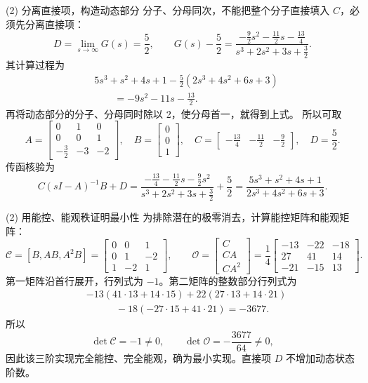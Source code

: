 \documentclass[11pt]{article}
\begin{document}
\begin{solution}
\begin{proofstep}{(2) 分离直接项，构造动态部分}
分子、分母同次，不能把整个分子直接填入 $C$，必须先分离直接项：
\[
D=\lim_{s\to\infty}G(s)=\frac52,
\qquad
G(s)-\frac52=\frac{-\frac92s^2-\frac{11}{2}s-\frac{13}{4}}
{s^3+2s^2+3s+\frac32}.
\]
其计算过程为
\[
\begin{aligned}
&5s^3+s^2+4s+1-\frac52(2s^3+4s^2+6s+3)\\
&\hspace{2em}=-9s^2-11s-\frac{13}{2}.
\end{aligned}
\]
再将动态部分的分子、分母同时除以 2，使分母首一，就得到上式。
所以可取
\[
\boxed{A=\begin{bmatrix}0&1&0\\0&0&1\\-\frac32&-3&-2\end{bmatrix},\quad
B=\begin{bmatrix}0\\0\\1\end{bmatrix},\quad
C=\begin{bmatrix}-\frac{13}{4}&-\frac{11}{2}&-\frac92\end{bmatrix},\quad D=\frac52.}
\]
传函核验为
\[
C(sI-A)^{-1}B+D
=\frac{-\frac{13}{4}-\frac{11}{2}s-\frac92s^2}{s^3+2s^2+3s+\frac32}+\frac52
=\frac{5s^3+s^2+4s+1}{2s^3+4s^2+6s+3}.
\]
\end{proofstep}

\pagebreak
\begin{proofstep}{(2) 用能控、能观秩证明最小性}
为排除潜在的极零消去，计算能控矩阵和能观矩阵：
\[
\mathcal C=[B,AB,A^2B]
=\begin{bmatrix}0&0&1\\0&1&-2\\1&-2&1\end{bmatrix},\qquad
\mathcal O=\begin{bmatrix}C\\CA\\CA^2\end{bmatrix}
=\frac14\begin{bmatrix}-13&-22&-18\\27&41&14\\-21&-15&13\end{bmatrix}.
\]
第一矩阵沿首行展开，行列式为 $-1$。第二矩阵的整数部分行列式为
\[
\begin{aligned}
&-13(41\cdot13+14\cdot15)
+22(27\cdot13+14\cdot21)\\
&\hspace{3em}-18(-27\cdot15+41\cdot21)=-3677.
\end{aligned}
\]
所以
\[
\det\mathcal C=-1\ne0,\qquad \det\mathcal O=-\frac{3677}{64}\ne0,
\]
因此该三阶实现完全能控、完全能观，确为最小实现。直接项 $D$ 不增加动态状态阶数。
\end{proofstep}
\end{solution}
\end{document}
